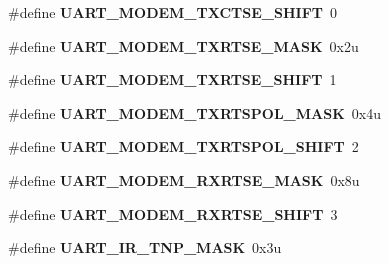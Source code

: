 \begin{DoxyCompactItemize}
\item 
\hypertarget{group___u_a_r_t___register___masks_gafa34ecab8ca4ea8d72e3c42d846ce96d}{}\#define {\bfseries U\+A\+R\+T\+\_\+\+M\+O\+D\+E\+M\+\_\+\+T\+X\+C\+T\+S\+E\+\_\+\+S\+H\+I\+F\+T}~0\label{group___u_a_r_t___register___masks_gafa34ecab8ca4ea8d72e3c42d846ce96d}

\item 
\hypertarget{group___u_a_r_t___register___masks_gabcfa3a03c9114f74c35bb22c13261c1b}{}\#define {\bfseries U\+A\+R\+T\+\_\+\+M\+O\+D\+E\+M\+\_\+\+T\+X\+R\+T\+S\+E\+\_\+\+M\+A\+S\+K}~0x2u\label{group___u_a_r_t___register___masks_gabcfa3a03c9114f74c35bb22c13261c1b}

\item 
\hypertarget{group___u_a_r_t___register___masks_gadc29d3e7148a1f7a895a1db6442cc5b8}{}\#define {\bfseries U\+A\+R\+T\+\_\+\+M\+O\+D\+E\+M\+\_\+\+T\+X\+R\+T\+S\+E\+\_\+\+S\+H\+I\+F\+T}~1\label{group___u_a_r_t___register___masks_gadc29d3e7148a1f7a895a1db6442cc5b8}

\item 
\hypertarget{group___u_a_r_t___register___masks_ga83617aa9166494f2dbed5da69b5ae0ef}{}\#define {\bfseries U\+A\+R\+T\+\_\+\+M\+O\+D\+E\+M\+\_\+\+T\+X\+R\+T\+S\+P\+O\+L\+\_\+\+M\+A\+S\+K}~0x4u\label{group___u_a_r_t___register___masks_ga83617aa9166494f2dbed5da69b5ae0ef}

\item 
\hypertarget{group___u_a_r_t___register___masks_ga3b069f2bfe05099b3fdb47e872c6b2e6}{}\#define {\bfseries U\+A\+R\+T\+\_\+\+M\+O\+D\+E\+M\+\_\+\+T\+X\+R\+T\+S\+P\+O\+L\+\_\+\+S\+H\+I\+F\+T}~2\label{group___u_a_r_t___register___masks_ga3b069f2bfe05099b3fdb47e872c6b2e6}

\item 
\hypertarget{group___u_a_r_t___register___masks_gaceb719e6bb4624e1b8a5a922bd594778}{}\#define {\bfseries U\+A\+R\+T\+\_\+\+M\+O\+D\+E\+M\+\_\+\+R\+X\+R\+T\+S\+E\+\_\+\+M\+A\+S\+K}~0x8u\label{group___u_a_r_t___register___masks_gaceb719e6bb4624e1b8a5a922bd594778}

\item 
\hypertarget{group___u_a_r_t___register___masks_gabbe55b53dd5c048084d8c9341e522d90}{}\#define {\bfseries U\+A\+R\+T\+\_\+\+M\+O\+D\+E\+M\+\_\+\+R\+X\+R\+T\+S\+E\+\_\+\+S\+H\+I\+F\+T}~3\label{group___u_a_r_t___register___masks_gabbe55b53dd5c048084d8c9341e522d90}

\item 
\hypertarget{group___u_a_r_t___register___masks_ga635e77629e602b47032f8d35dda0f442}{}\#define {\bfseries U\+A\+R\+T\+\_\+\+I\+R\+\_\+\+T\+N\+P\+\_\+\+M\+A\+S\+K}~0x3u\label{group___u_a_r_t___register___masks_ga635e77629e602b47032f8d35dda0f442}


\end{DoxyCompactItemize}
